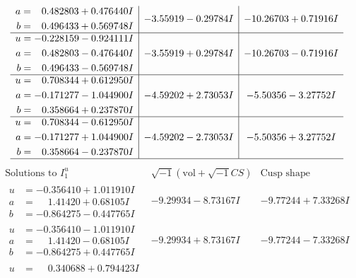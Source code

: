 \documentclass[1p]{elsarticle_modified}
\theoremstyle{definition}
\newcommand{\I}{\sqrt{-1}}
\begin{document}
$$\begin{array}{c|c|c}
\begin{aligned}
a &= \phantom{-}0.482803 + 0.476440 I \\
b &= \phantom{-}0.496433 + 0.569748 I\end{aligned}
 & -3.55919 - 0.29784 I & -10.26703 + 0.71916 I \\ \hline\begin{aligned}
u &= -0.228159 - 0.924111 I \\
a &= \phantom{-}0.482803 - 0.476440 I \\
b &= \phantom{-}0.496433 - 0.569748 I\end{aligned}
 & -3.55919 + 0.29784 I & -10.26703 - 0.71916 I \\ \hline\begin{aligned}
u &= \phantom{-}0.708344 + 0.612950 I \\
a &= -0.171277 - 1.044900 I \\
b &= \phantom{-}0.358664 + 0.237870 I\end{aligned}
 & -4.59202 + 2.73053 I & -5.50356 - 3.27752 I \\ \hline\begin{aligned}
u &= \phantom{-}0.708344 - 0.612950 I \\
a &= -0.171277 + 1.044900 I \\
b &= \phantom{-}0.358664 - 0.237870 I\end{aligned}
 & -4.59202 - 2.73053 I & -5.50356 + 3.27752 I\\
 \hline 
 \end{array}$$\newpage$$\begin{array}{c|c|c}  
\text{Solutions to }I^u_{1}& \I (\text{vol} + \sqrt{-1}CS) & \text{Cusp shape}\\
 \hline 
\begin{aligned}
u &= -0.356410 + 1.011910 I \\
a &= \phantom{-}1.41420 + 0.68105 I \\
b &= -0.864275 - 0.447765 I\end{aligned}
 & -9.29934 - 8.73167 I & -9.77244 + 7.33268 I \\ \hline\begin{aligned}
u &= -0.356410 - 1.011910 I \\
a &= \phantom{-}1.41420 - 0.68105 I \\
b &= -0.864275 + 0.447765 I\end{aligned}
 & -9.29934 + 8.73167 I & -9.77244 - 7.33268 I \\ \hline\begin{aligned}
u &= \phantom{-}0.340688 + 0.794423 I \\

\end{aligned}
\end{array}$$
\end{document}
